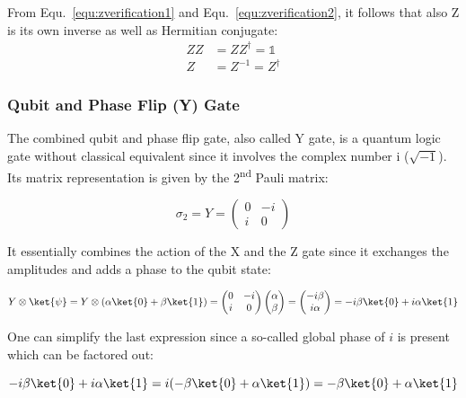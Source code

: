 From Equ.~\ref{equ:zverification1} and Equ.~\ref{equ:zverification2}, it follows that also Z is its own inverse as well as Hermitian conjugate:
\begin{align}
ZZ &= ZZ^\dagger = \mathbb{1} \\
Z &= Z^{-1} = Z^\dagger
\end{align}

\subsubsection{Qubit and Phase Flip (Y) Gate}
\label{subsubsubsec:ygate}

The combined qubit and phase flip gate, also called Y gate, is a quantum logic gate without classical equivalent since it involves the complex number i ($\sqrt{-1}$). Its matrix representation is given by the 2\textsuperscript{nd} Pauli matrix:

\begin{equation}
\sigma_{2} = Y = \begin{pmatrix}
 0 & -i \\ 
 i & 0
 \end{pmatrix}
\end{equation}

It essentially combines the action of the X and the Z gate since it exchanges the amplitudes and adds a phase to the qubit state:

\begin{equation}
\label{equ:yverification1}
Y \otimes \ket{\psi} = Y \otimes (\alpha \ket{0} + \beta \ket{1}) = \begin{pmatrix}
 0 & -i \\ 
 i & 0
 \end{pmatrix} \begin{pmatrix}
 \alpha  \\ 
 \beta
 \end{pmatrix} = \begin{pmatrix}
 -i\beta  \\ 
 i\alpha
 \end{pmatrix} = -i\beta \ket{0} + i\alpha \ket{1}
\end{equation}

One can simplify the last expression since a so-called global phase of $i$ is present which can be factored out:

\begin{equation}
\label{equ:yverification2}
-i\beta \ket{0} + i\alpha \ket{1} = i(-\beta \ket{0} + \alpha \ket{1}) = -\beta \ket{0} + \alpha \ket{1}
\end{equation}

